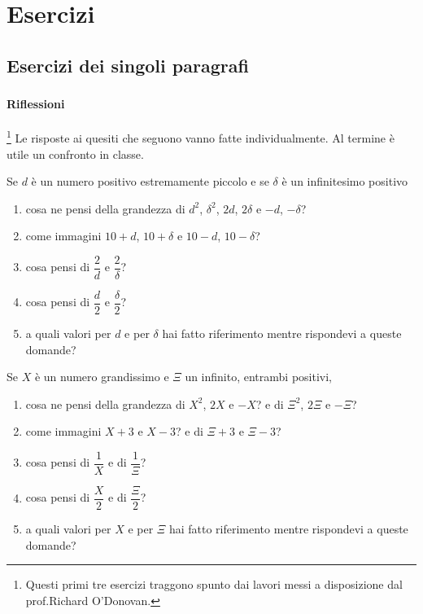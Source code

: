 

\section{Esercizi}

\subsection{Esercizi dei singoli paragrafi}

\subsubsection*{}

\paragraph{Riflessioni}
\footnote{Questi primi tre esercizi traggono spunto dai lavori messi a disposizione
dal prof.Richard O'Donovan.}
Le risposte ai quesiti che seguono vanno fatte individualmente. Al termine è 
utile un confronto in classe.

\begin{esercizio}
Se $d$ è un numero positivo estremamente piccolo e se $\delta$ è un 
infinitesimo positivo
\begin{enumerate} [noitemsep]
\item  cosa ne pensi della grandezza di $d^2$, $\delta^2$, $2d$, $2\delta$ e 
$-d$, $-\delta$?
\item come immagini $10+d$, $10+\delta$ e $10-d$, $10-\delta$?
\item cosa pensi di $\dfrac{2}{d}$ e $\dfrac{2}{\delta}$?
\item cosa pensi di $\dfrac{d}{2}$ e $\dfrac{\delta}{2}$?
\item a quali valori per $d$ e per $\delta$ hai fatto riferimento mentre
 rispondevi a queste domande?
\end{enumerate}
\end{esercizio}

\begin{esercizio}
Se $X$ è un numero grandissimo e $\Xi$ un infinito, entrambi positivi,
\begin{enumerate} [noitemsep]
\item cosa ne pensi della grandezza di $X^2$, $2X$ e $-X$? e di $\Xi^2$, $2\Xi$
e $-\Xi$?
\item come immagini $X+3$ e $X-3$? e di $\Xi+3$ e $\Xi-3$?
\item cosa pensi di $\dfrac{1}{X}$ e di $\dfrac{1}{\Xi}$?
\item cosa pensi di $\dfrac{X}{2}$ e di $\dfrac{\Xi}{2}$?
\item a quali valori per $X$ e per $\Xi$ hai fatto riferimento mentre
 rispondevi a queste domande?
 \end{enumerate}
\end{esercizio}

